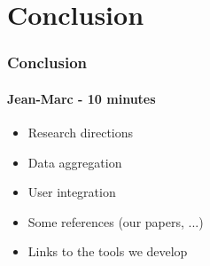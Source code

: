 \section{Conclusion}

\frame
{
  \frametitle{Conclusion}
  \framesubtitle{Jean-Marc - 10 minutes}

  \begin{itemize}
  \item Research directions
  \item Data aggregation
  \item User integration
  \item Some references (our papers, ...)
  \item Links to the tools we develop
  \end{itemize}
}
